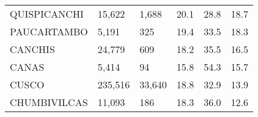 \begin{tabular}{llllll}
	\cellcolor[HTML]{FF5050}QUISPICANCHI                           & 15,622                                                                & 1,688                                                            & 20.1                                                                             & 28.8                                                                        & 18.7                                                                                \\
	\cellcolor[HTML]{FF5050}PAUCARTAMBO                            & 5,191                                                                 & 325                                                              & 19.4                                                                             & 33.5                                                                        & 18.3                                                                                \\
	\cellcolor[HTML]{FF5050}CANCHIS                                & 24,779                                                                & 609                                                              & 18.2                                                                             & 35.5                                                                        & 16.5                                                                                \\
	\cellcolor[HTML]{FF5050}CANAS                                  & 5,414                                                                 & 94                                                               & 15.8                                                                             & 54.3                                                                        & 15.7                                                                                \\
	\cellcolor[HTML]{F8CBAD}CUSCO                                  & 235,516                                                               & 33,640                                                           & 18.8                                                                             & 32.9                                                                        & 13.9                                                                                \\
	\cellcolor[HTML]{F8CBAD}CHUMBIVILCAS                           & 11,093                                                                & 186                                                              & 18.3                                                                             & 36.0                                                                        & 12.6                                                                                \\

\end{tabular}
